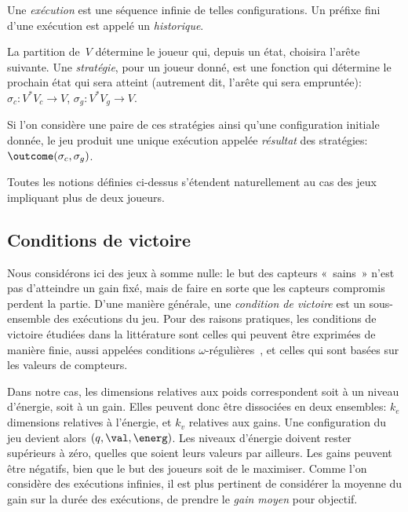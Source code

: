 Une \emph{exécution} est une séquence infinie de telles configurations.
Un préfixe fini d'une exécution est appelé un \emph{historique}.

La partition de~$V$ détermine le joueur qui, depuis un état, choisira l'arête suivante.
Une \emph{stratégie}, pour un joueur donné, est une fonction qui détermine le prochain état qui sera atteint (autrement dit, l'arête qui sera empruntée): $\sigma_c: V^* V_c \rightarrow V$, $\sigma_g: V^* V_g \rightarrow V$.

Si l'on considère une paire de ces stratégies ainsi qu'une configuration initiale donnée, le jeu produit une unique exécution appelée \emph{résultat} des stratégies: $\outcome(\sigma_c,\sigma_g)$.

\begin{remark}
Toutes les notions définies ci-dessus s'étendent naturellement au cas des jeux impliquant plus de deux joueurs.
\end{remark}

\subsection{Conditions de victoire}

Nous considérons ici des jeux à somme nulle: le but des capteurs « sains » n'est pas d'atteindre un gain fixé, mais de faire en sorte que les capteurs compromis perdent la partie.
D'une manière générale, une \emph{condition de victoire} est un sous-ensemble des exécutions du jeu.
Pour des raisons pratiques, les conditions de victoire étudiées dans la littérature sont celles qui peuvent être exprimées de manière finie, aussi appelées conditions $\omega$-régulières~\cite{GTW02}, et celles qui sont basées sur les valeurs de compteurs.

Dans notre cas, les dimensions relatives aux poids correspondent soit à un niveau d'énergie, soit à un gain.
Elles peuvent donc être dissociées en deux ensembles: $k_e$ dimensions relatives à l'énergie, et $k_v$ relatives aux gains.
Une configuration du jeu devient alors $(q,\val,\energ)$.
Les niveaux d'énergie doivent rester supérieurs à zéro, quelles que soient leurs valeurs par ailleurs.
Les gains peuvent être négatifs, bien que le but des joueurs soit de le maximiser.
Comme l'on considère des exécutions infinies, il est plus pertinent de considérer la moyenne du gain sur la durée des exécutions, \cad de prendre le \emph{gain moyen} pour objectif.

